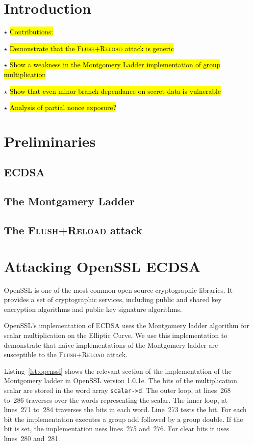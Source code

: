 \documentclass{llncs}
\newcommand{\starpar}[1]{\par{\footnotesize $\star$ \hl{#1}\par}}
\begin{document}
\begin{abstract}
\end{abstract}

\section{Introduction}

\starpar{Contributions:}
\starpar{Demonstrate that the \textsc{Flush+Reload} attack is generic}
\starpar{Show a weakness in the Montgomery Ladder implementation of group multiplication}
\starpar{Show that even minor branch dependance on secret data is vulnerable}
\starpar{Analysis of partial nonce exposure?}
\section{Preliminaries}
\subsection{ECDSA}
\subsection{The Montgamery Ladder}
\subsection{The \textsc{Flush+Reload} attack}
\section{Attacking OpenSSL ECDSA}
OpenSSL is one of the most common open-source cryptographic libraries.
It provides a set of cryptographic services, including public and shared key encryption 
algorithms and public key signature algorithms.

OpenSSL's implementation of ECDSA uses the Montgomery ladder algorithm for scalar multiplication
on the Elliptic Curve.
We use this implementation to demonstrate that na{\"\i}ve implementations of the Montgomery ladder are
susceptible to the \textsc{Flush+Reload} attack.

Listing~\ref{lst:openssl} shows the relevant section of the implementation of the Montgomery ladder in OpenSSL version 1.0.1e.
The bits of the multiplication scalar are stored in the word array \texttt{scalar->d}.
The outer loop, at lines~268 to~286 traverses over the words representing the scalar.
The inner loop, at lines~271 to~284 traverses the bits in each word.
Line~273 tests the bit. 
For each bit the implementation executes a group add followed by a group double.
If the bit is set, the implementation uses lines~275 and~276.
For clear bits it uses lines~280 and~281.
\end{document}
